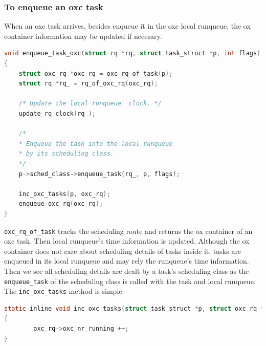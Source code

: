 \subsubsection{To enqueue an oxc task}
When an oxc task arrives, besides enqueue it in the oxc local runqueue,
the ox container information may be updated if necesary.
\begin{lstlisting}[language=C]
void enqueue_task_oxc(struct rq *rq, struct task_struct *p, int flags)
{
	struct oxc_rq *oxc_rq = oxc_rq_of_task(p);
	struct rq *rq_ = rq_of_oxc_rq(oxc_rq);

	/* Update the local runqueue' clock. */
	update_rq_clock(rq_);

	/*
	* Enqueue the task into the local runqueue
	* by its scheduling class.
	*/
	p->sched_class->enqueue_task(rq_, p, flags);

	inc_oxc_tasks(p, oxc_rq);
	enqueue_oxc_rq(oxc_rq);
}
\end{lstlisting}
\texttt{oxc\_rq\_of\_task} tracks the scheduling route and returns the ox
container of an oxc task. Then local runqueue's time information is updated.
Although the ox container does not care about scheduling details of tasks 
inside it, tasks are enqueued in its local runqueue and may rely the
runqueue's time information. Then we see all scheduling details are dealt 
by a task's scheduling class as the \texttt{enqueue\_task} of the
scheduling class is called with the task and local runqueue.
The \texttt{inc\_oxc\_tasks} method is simple.
\begin{lstlisting}[language=C]
static inline void inc_oxc_tasks(struct task_struct *p, struct oxc_rq *oxc_rq)
{
        oxc_rq->oxc_nr_running ++;
}
\end{lstlisting}

